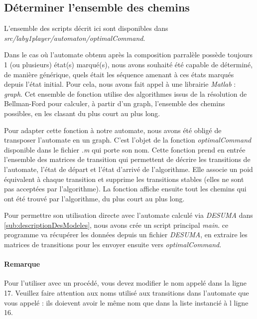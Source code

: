 \subsection{Déterminer l'ensemble des chemins}\label{sub:ensembleDesChemins}%
\begin{center}
L'ensemble des scripts décrit ici sont disponibles dans \emph{src/laby1player/automaton/optimalCommand}.
\end{center}

Dans le cas où l'automate obtenu après la composition parralèle possède toujours 1 (ou plusieurs) état(s) marqué(s), nous avons souhaité été capable de déterminé, de manière générique, quels était les séquence amenant à ces états marqués depuis l'état initial. Pour cela, nous avons fait appel à une librairie \emph{Matlab} : \emph{graph}. Cet ensemble de fonction utilise des algorithmes issus de la résolution de Bellman-Ford pour calculer, à partir d'un graph, l'ensemble des chemins possibles, en les clasant du plus court au plus long.

Pour adapter cette fonction à notre automate, nous avons été obligé de transposer l'automate en un graph. C'est l'objet de la fonction \emph{optimalCommand} disponible dans le fichier \emph{.m} qui porte son nom. Cette fonction prend en entrée l'ensemble des matrices de transition qui permettent de décrire les transitions de l'automate, l'état de départ et l'état d'arrivé de l'algorithme. Elle associe un poid équivalent à chaque transition et supprime les transitions stables (elles ne sont pas acceptées par l'algorithme). La fonction affiche ensuite tout les chemins qui ont été trouvé par l'algorithme, du plus court au plus long. 

Pour permettre son utilisation directe avec l'automate calculé via \emph{DESUMA} dans \ref{sub:descriptionDesModeles}, nous avons crée un script principal \emph{main}. ce programme va récupérer les données depuis un fichier \emph{DESUMA}, en extraire les matrices de transitions pour les envoyer ensuite vers \emph{optimalCommand}. 


\paragraph*{Remarque} Pour l'utiliser avec un procédé, vous devez modifier le nom appelé dans la ligne 17. Veuillez faire attention aux noms utilisé aux transitions dans l'automate que vous appelé : ils doievent avoir le même nom que dans la liste instancié à l ligne 16.


